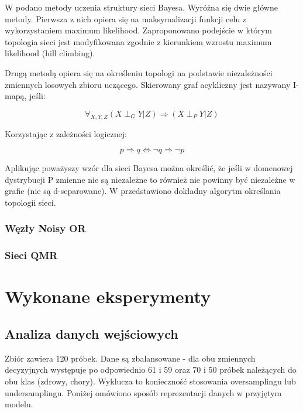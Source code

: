 \documentclass{article}
\begin{document}
W \cite{PhD} podano metody uczenia struktury sieci Bayesa. Wyróżna się dwie główne metody. Pierwsza z nich opiera się na maksymalizacji funkcji celu z wykorzystaniem maximum likelihood. Zaproponowano podejście w którym topologia sieci jest modyfikowana zgodnie z kierunkiem wzrostu maximum likelihood (hill climbing).

Drugą metodą opiera się na określeniu topologi na podstawie niezależności zmiennych losowych zbioru uczącego. Skierowany graf acykliczny jest nazywany I-mapą, jeśli:

\begin{equation}
	\forall_{X, Y, Z} (X \perp_G Y| Z) 	\Rightarrow  (X \perp_P Y | Z)
\end{equation}

Korzystając z zależności logicznej:

\begin{equation}
	p \Rightarrow q \Leftrightarrow \neg q \Rightarrow \neg p
\end{equation}

Aplikując poważyszy wzór dla sieci Bayesa można określić, że jeśli w domenowej dystrybucji P zmienne nie są niezależne to również nie powinny być niezależne w grafie (nie są d-separowane). W \cite{PhD} przedstawiono dokładny algorytm określania topologii sieci.

\subsubsection{Węzły Noisy OR}

\subsubsection{Sieci QMR}

\section{Wykonane eksperymenty}

\subsection{Analiza danych wejściowych}

Zbiór zawiera 120 próbek. Dane są zbalansowane - dla obu zmiennych decyzyjnych występuje po odpowiednio 61 i 59 oraz 70 i 50 próbek należących do obu klas (zdrowy, chory). Wyklucza to konieczność stosowania oversamplingu lub undersamplingu. Poniżej omówiono sposób reprezentacji danych w przyjętym modelu.
\end{document}
